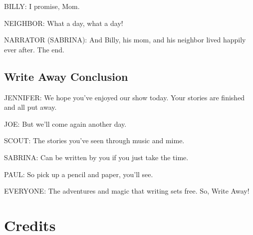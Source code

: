 BILLY:
I promise, Mom.

NEIGHBOR:
What a day, what a day!

NARRATOR (SABRINA):
And Billy, his mom, and his neighbor lived happily ever after.
The end.

\subsection{Write Away Conclusion}

JENNIFER:
We hope you've enjoyed our show today.
Your stories are finished and all put away.

JOE:
But we'll come again another day.

SCOUT:
The stories you've seen through music and mime.

SABRINA:
Can be written by you if you just take the time.

PAUL:
So pick up a pencil and paper, you'll see.

EVERYONE:
The adventures and magic that writing sets free.
So, Write Away!

\section{Credits}